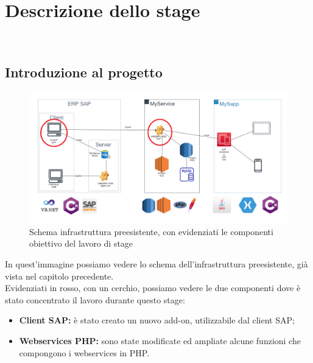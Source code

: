 
\chapter{Descrizione dello stage}
\label{cap:descrizione-stage}

\\

\section{Introduzione al progetto}
\begin{figure}[!h] 
	\centering 
	\includegraphics[scale = 0.5]{immagini/obiettivi-stage.png} 
	\caption{Schema infrastruttura preesistente, con evidenziati le componenti obiettivo del lavoro di stage}
\end{figure}
\newpage
\begin{flushleft}
	In quest'immagine possiamo vedere lo schema dell'infrastruttura preesistente, già vista nel capitolo precedente.\\
	Evidenziati in rosso, con un cerchio, possiamo vedere le due componenti dove è stato concentrato il lavoro durante questo stage:
\end{flushleft}

\begin{itemize}
	\item \textbf{Client SAP:} è stato creato un nuovo add-on, utilizzabile dal client SAP;
	\item \textbf{Webservices PHP:} sono state modificate ed ampliate alcune funzioni che compongono i webservices in PHP.
\end{itemize}
